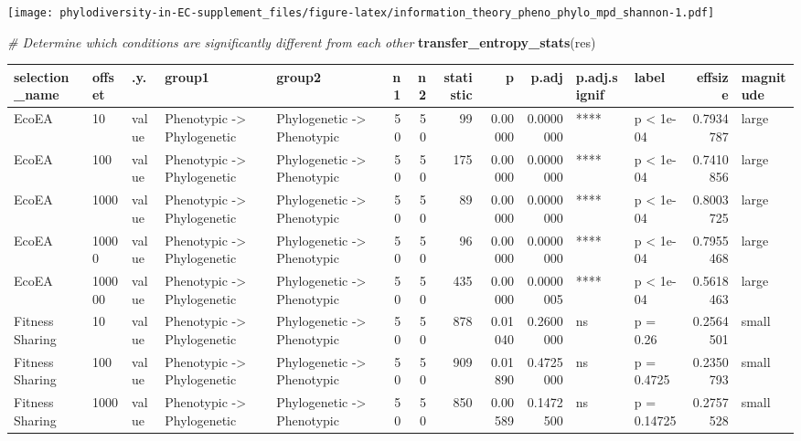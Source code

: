 \documentclass[]{book}
\newenvironment{Shaded}{\begin{snugshade}}{\end{snugshade}}
\newcommand{\CommentTok}[1]{\textcolor[rgb]{0.56,0.35,0.01}{\textit{#1}}}
\newcommand{\KeywordTok}[1]{\textcolor[rgb]{0.13,0.29,0.53}{\textbf{#1}}}
\newcommand{\NormalTok}[1]{#1}
\begin{document}
\texttt{[image: phylodiversity-in-EC-supplement\_files/figure-latex/information\_theory\_pheno\_phylo\_mpd\_shannon-1.pdf]}

\begin{Shaded}
\begin{Highlighting}[]
\CommentTok{# Determine which conditions are significantly different from each other}
\KeywordTok{transfer_entropy_stats}\NormalTok{(res)}
\end{Highlighting}
\end{Shaded}

\begin{table}
\centering
\begin{tabular}[t]{l|l|l|l|l|r|r|r|r|r|l|l|r|l}
\hline
selection\_name & offset & .y. & group1 & group2 & n1 & n2 & statistic & p & p.adj & p.adj.signif & label & effsize & magnitude\\
\hline
EcoEA & 10 & value & Phenotypic
    ->
Phylogenetic & Phylogenetic
    ->
Phenotypic & 50 & 50 & 99 & 0.00000 & 0.0000000 & **** & p < 1e-04 & 0.7934787 & large\\
\hline
EcoEA & 100 & value & Phenotypic
    ->
Phylogenetic & Phylogenetic
    ->
Phenotypic & 50 & 50 & 175 & 0.00000 & 0.0000000 & **** & p < 1e-04 & 0.7410856 & large\\
\hline
EcoEA & 1000 & value & Phenotypic
    ->
Phylogenetic & Phylogenetic
    ->
Phenotypic & 50 & 50 & 89 & 0.00000 & 0.0000000 & **** & p < 1e-04 & 0.8003725 & large\\
\hline
EcoEA & 10000 & value & Phenotypic
    ->
Phylogenetic & Phylogenetic
    ->
Phenotypic & 50 & 50 & 96 & 0.00000 & 0.0000000 & **** & p < 1e-04 & 0.7955468 & large\\
\hline
EcoEA & 100000 & value & Phenotypic
    ->
Phylogenetic & Phylogenetic
    ->
Phenotypic & 50 & 50 & 435 & 0.00000 & 0.0000005 & **** & p < 1e-04 & 0.5618463 & large\\
\hline
Fitness Sharing & 10 & value & Phenotypic
    ->
Phylogenetic & Phylogenetic
    ->
Phenotypic & 50 & 50 & 878 & 0.01040 & 0.2600000 & ns & p = 0.26 & 0.2564501 & small\\
\hline
Fitness Sharing & 100 & value & Phenotypic
    ->
Phylogenetic & Phylogenetic
    ->
Phenotypic & 50 & 50 & 909 & 0.01890 & 0.4725000 & ns & p = 0.4725 & 0.2350793 & small\\
\hline
Fitness Sharing & 1000 & value & Phenotypic
    ->
Phylogenetic & Phylogenetic
    ->
Phenotypic & 50 & 50 & 850 & 0.00589 & 0.1472500 & ns & p = 0.14725 & 0.2757528 & small\\

\end{tabular}
\end{table}
\end{document}

